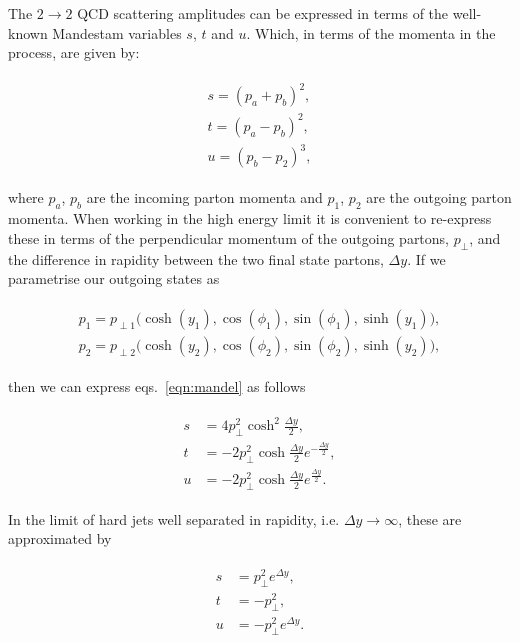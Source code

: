 		The $2\rightarrow 2$ QCD scattering amplitudes can be expressed in terms of the well-known Mandestam
		variables $s$, $t$ and $u$.  Which, in terms of the momenta in the process, are given by:

		\begin{align}
		\begin{split}
			s = (p_a + p_b)^2, \\
			t = (p_a - p_b)^2, \\
			u = (p_b - p_2)^3,
			\label{eqn:mandel}
		\end{split}
		\end{align}

		where $p_a$, $p_b$ are the incoming parton momenta and $p_1$, $p_2$ are the outgoing parton momenta.
		When working in the high energy limit it is convenient to re-express these in terms of the
		perpendicular momentum of the outgoing partons, $p_\perp$, and the difference in rapidity
		between the two final state partons, $\Delta y$.  If we parametrise our outgoing states as

		\begin{align}
		\begin{split}
			p_1 = p_{\perp1}\big(\cosh (y_1), \cos(\phi_1), \sin(\phi_1), \sinh (y_1)\big),\\
			p_2 = p_{\perp2}\big(\cosh (y_2), \cos(\phi_2), \sin(\phi_2), \sinh (y_2)\big),
		\end{split}
		\end{align}

		then we can express eqs.~\eqref{eqn:mandel} as follows

		\begin{align}
		\begin{split}
			s &= 4p_\perp^2 \cosh^2\frac{\Delta y}{2},\\
			t &= -2p_\perp^2 \cosh\frac{\Delta y}{2}e^{-\frac{\Delta y}{2}},\\
			u &= -2p_\perp^2 \cosh\frac{\Delta y}{2}e^{\frac{\Delta y}{2}}.
		\end{split}
		\end{align}

		In the limit of hard jets well separated in rapidity, i.e. $\Delta y\rightarrow\infty$,
		these are approximated by

		\begin{align}
		\begin{split}
			s &= p_\perp^2 e^{\Delta y},\\
			t &= -p_\perp^2,\\
			u &= -p_\perp^2 e^{\Delta y}.
			\label{eqn:mandel2}
		\end{split}
		\end{align}

